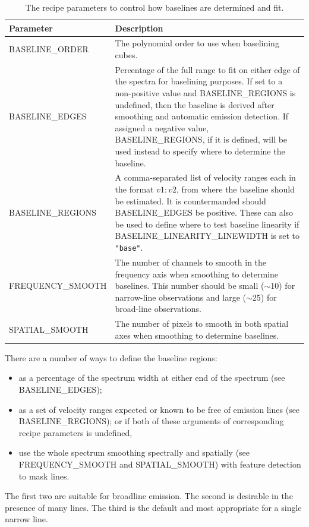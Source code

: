 \documentclass[11pt,oneside,chapters]{starlink}
\begin{document}
\begin{table}[h!]
\begin{small}
\begin{tabular}{|p{6.8cm}|p{8.6cm}|}
\hline
\textbf{Parameter} & \textbf{Description} \\
\hline
BASELINE\_ORDER & The polynomial order to use when baselining cubes.\\
\hline
BASELINE\_EDGES & Percentage of the full range to fit on either edge of the spectra
                  for baselining purposes.  If set to a non-positive value and
                  BASELINE\_REGIONS is undefined, then the baseline is derived after
                  smoothing and automatic emission detection.  If assigned a negative
                  value, BASELINE\_REGIONS, if it is defined, will be used instead to
                  specify where to determine the baseline. \\
\hline
BASELINE\_REGIONS & A comma-separated list of velocity ranges each in the format
                    $v1:v2$, from where the baseline should be estimated.  It is
                    countermanded should BASELINE\_EDGES be positive.  These can also
                    be used to define where to test baseline linearity if
                    BASELINE\_LINEARITY\_LINEWIDTH is set to \texttt{"base"}. \\
\hline
FREQUENCY\_SMOOTH & The number of channels to smooth in the frequency axis when
                    smoothing to determine baselines.  This number should be small
                    ($\sim$10) for narrow-line observations and large
                    ($\sim$25) for broad-line observations. \\
SPATIAL\_SMOOTH & The number of pixels to smooth in both spatial axes when
                  smoothing to determine baselines. \\
\hline
\end{tabular}
\end{small}
\caption{\label{tab:bsfit_params}
  The recipe parameters to control how baselines are determined and fit.}
\end{table}
There are a number of ways to define the baseline regions:
\begin{itemize}
\item as a percentage of the spectrum width at either end of the spectrum
      (see BASELINE\_EDGES);
\item as a set of velocity ranges expected or known to be free of emission
      lines (see BASELINE\_REGIONS); or if both of these arguments of
      corresponding recipe parameters is undefined,
\item use the whole spectrum smoothing spectrally and spatially (see
      FREQUENCY\_SMOOTH and SPATIAL\_SMOOTH) with feature detection to mask
      lines.
\end{itemize}
The first two are suitable for broadline emission.  The second is
desirable in the presence of many lines.  The third is the default and
most appropriate for a single narrow line.
\bigskip
\end{document}
